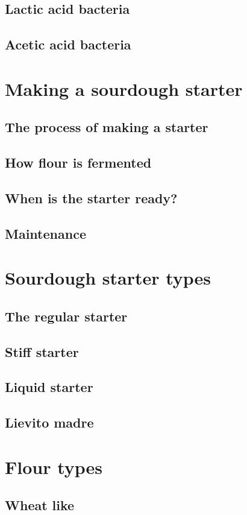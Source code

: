 \documentclass[a4paper, 12pt]{book}
\begin{document}
\section{Lactic acid bacteria}
\section{Acetic acid bacteria}

\chapter{Making a sourdough starter}
\section{The process of making a starter}
\section{How flour is fermented}
\section{When is the starter ready?}
\section{Maintenance}

\chapter{Sourdough starter types}
\section{The regular starter}
\section{Stiff starter}
\section{Liquid starter}
\section{Lievito madre}

\chapter{Flour types}
\section{Wheat like}
\end{document}
